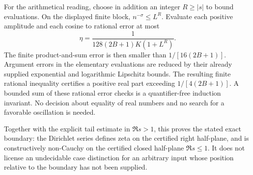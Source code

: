 For the arithmetical reading, choose in addition an integer
$R\ge|s|$ to bound evaluations.  On the displayed finite block,
$n^{-\sigma}\le L^R$.  Evaluate each positive amplitude and each
cosine to rational error at most
\[
 \eta=\frac1{128(2B+1)K(1+L^R)}.
\]
The finite product-and-sum error is then smaller than
$1/[16(2B+1)]$.  Argument errors in the elementary evaluations are
reduced by their already supplied exponential and logarithmic
Lipschitz bounds.  The resulting finite rational inequality
certifies a positive real part exceeding
$1/[4(2B+1)]$.  A bounded sum of these rational error checks is a
quantifier-free induction invariant.  No decision about equality of
real numbers and no search for a favorable oscillation is needed.

Together with the explicit tail estimate in $\Re s>1$, this proves
the stated exact boundary: the Dirichlet series defines zeta on the
certified right half-plane, and is constructively non-Cauchy on the
certified closed half-plane $\Re s\le1$.  It does not license an
undecidable case distinction for an arbitrary input whose position
relative to the boundary has not been supplied.
